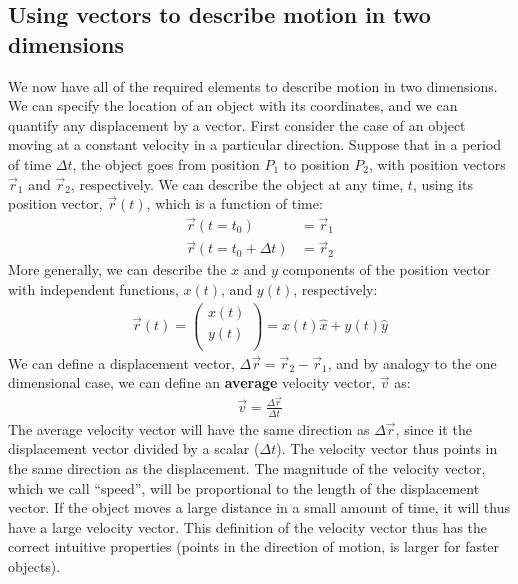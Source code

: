 \subsection{Using vectors to describe motion in two dimensions}
We now have all of the required elements to describe motion in two dimensions. We can specify the location of an object with its coordinates, and we can quantify any displacement by a vector. First consider the case of an object moving at a constant velocity in a particular direction. Suppose that in a period of time $\Delta t$, the object goes from position $P_1$ to position $P_2$, with position vectors $\vec r_1$ and $\vec r_2$, respectively. We can describe the object at any time, $t$, using its position vector, $\vec r(t)$, which is a function of time:
\begin{align*}
\vec r(t=t_0)&=\vec r_1\\
\vec r(t=t_0+\Delta t)&=\vec r_2
\end{align*}
More generally, we can describe the $x$ and $y$ components of the position vector with independent functions, $x(t)$, and $y(t)$, respectively:
\begin{align*}
\vec r(t) = \begin{pmatrix}
           x(t) \\
           y(t) \\
         \end{pmatrix}= x(t) \hat x + y(t) \hat y
\end{align*}
We can define a displacement vector, $\Delta\vec r=\vec r_2-\vec r_1$, and by analogy to the one dimensional case, we can define an \textbf{average} velocity vector, $\vec v$ as:
\begin{align}
\vec v = \frac{\Delta \vec r}{\Delta t}
\end{align}
The average velocity vector will have the same direction as $\Delta \vec r$, since it the displacement vector divided by a scalar ($\Delta t$). The velocity vector thus points in the same direction as the displacement. The magnitude of the velocity vector, which we call ``speed'', will be proportional to the length of the displacement vector. If the object moves a large distance in a small amount of time, it will thus have a large velocity vector. This definition of the velocity vector thus has the correct intuitive properties (points in the direction of motion, is larger for faster objects).

